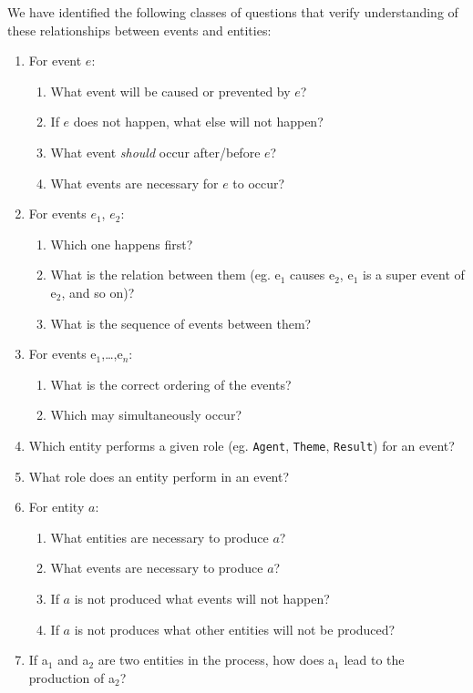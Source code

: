 \documentclass[11pt]{article}
\begin{document}
  We have identified the following classes of questions that verify
  understanding of these relationships between events and entities:

\begin{enumerate}
\item For event $e$:
\begin{enumerate}
\item What event will be caused or prevented by $e$?
\item If $e$ does not happen, what else will not happen?
\item What event \emph{should} occur after/before $e$?
\item What events are necessary for $e$ to occur?
\end{enumerate}
\item For events $e_1$, $e_2$:
\begin{enumerate}
\item Which one happens first?
\item What is the relation between them (eg. e$_1$ causes e$_2$, e$_1$ is
        a super event of e$_2$, and so on)?
\item What is the sequence of events between them?
\end{enumerate}
\item For events e$_1$,\ldots{},e$_n$:
\begin{enumerate}
\item What is the correct ordering of the events?
\item Which may simultaneously occur?
\end{enumerate}
\item Which entity performs a given role (eg. \texttt{Agent}, \texttt{Theme},
     \texttt{Result}) for an event?
\item What role does an entity perform in an event?
\item For entity $a$:
\begin{enumerate}
\item What entities are necessary to produce $a$?
\item What events are necessary to produce $a$?
\item If $a$ is not produced what events will not happen?
\item If $a$ is not produces what other entities will not be
        produced?
\end{enumerate}
\item If a$_1$ and a$_2$ are two entities in the process, how does a$_1$ lead
     to the production of a$_2$?
\end{enumerate}
\end{document}
